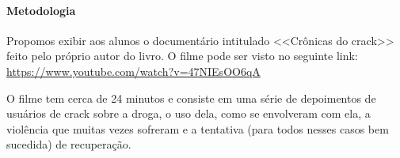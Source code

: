 \documentclass[12pt]{extarticle}
\begin{document}
\paragraph{Metodologia}
	
		Propomos exibir aos alunos o documentário
		intitulado <<Crônicas do crack>> feito pelo próprio
		autor do livro. O filme pode ser visto no seguinte link:
		\url{https://www.youtube.com/watch?v=47NIEsOO6qA}

		O filme tem cerca de 24 minutos e consiste em uma série de depoimentos
		de usuários de crack sobre
		a droga, o uso dela, como se envolveram com ela, 
		a violência que muitas vezes sofreram e a
		tentativa (para todos nesses casos bem sucedida) de recuperação.
\end{document}
